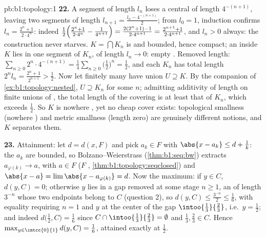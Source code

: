 \begin{solution}{pb:b1:topology:1}
\textbf{22.} A segment of length $l_n$ loses a central 
of length $4^{-(n+1)}$, leaving two segments of length $l_{n+1}
= \frac{l_n - 4^{-(n+1)}}{2}$; from $l_0 = 1$, induction
confirms $l_n = \frac{2^n + 1}{2\cdot4^n}$: indeed
$\frac12\Bigl(\frac{2^n+1}{2\cdot4^n} - \frac{1}{4^{n+1}}\Bigr)
= \frac{2(2^n + 1) - 1}{2\cdot4^{n+1}} = \frac{2^{n+1} +
1}{2\cdot4^{n+1}}$, and $l_n > 0$ always: the construction never
starves. $K = \bigcap K_n$ is  and bounded, hence compact;
an  inside $K$ lies in one segment of $K_n$, of length
$l_n \to 0$: empty . Removed length: $\sum_{n\geq0} 2^n
\cdot 4^{-(n+1)} = \frac14\sum_{n\geq0}\bigl(\frac12\bigr)^n =
\frac12$, and each $K_n$ has total length $2^n l_n = \frac{2^n +
1}{2^{n+1}} > \frac12$. Now let finitely many  
have union $U \supseteq K$. By the companion  of
\cref{ex:b1:topology:nested}, $U \supseteq K_n$ for some $n$;
admitting additivity of length on finite unions of ,
the total length of the covering  is at least that of
$K_n$, which exceeds $\frac12$. So $K$ is nowhere , yet no
cheap cover exists: topological smallness (nowhere ) and
metric smallness (length zero) are genuinely different notions,
and $K$ separates them.

\textbf{23.} Attainment: let $d = d(x, F)$ and pick $a_k \in F$
with $\abs{x - a_k} \leq d + \frac1k$: the $a_k$ are bounded, so
Bolzano--Weierstrass (\cref{thm:b1:seq:bw}) extracts
$a_{\varphi(k)} \to a$, with $a \in F$ ($F$ ,
\cref{thm:b1:topology:seqclosed}) and $\abs{x - a} = \lim
\abs{x - a_{\varphi(k)}} = d$. Now the maximum: if $y \in C$,
$d(y, C) = 0$; otherwise $y$ lies in a gap removed at some stage
$n \geq 1$, an   of length $3^{-n}$ whose two
endpoints belong to $C$ (question 2), so $d(y, C) \leq
\frac{3^{-n}}{2} \leq \frac16$, with equality requiring $n = 1$
and $y$ at the center of the gap $\intoo{\frac13}{\frac23}$,
i.e.\ $y = \frac12$; and indeed $d\bigl(\frac12, C\bigr) =
\frac16$ since $C \cap \intoo{\frac13}{\frac23} = \emptyset$ and
$\frac13, \frac23 \in C$. Hence $\max_{y\in\intcc{0}{1}} d(y, C)
= \frac16$, attained exactly at $\frac12$.


\end{solution}
